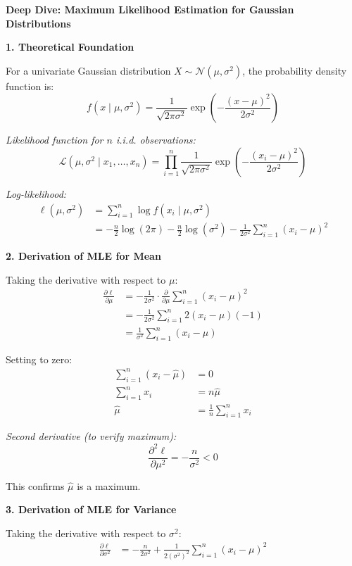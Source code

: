 \documentclass[12pt]{article}
\begin{document}
\begin{explanation}
\textbf{Deep Dive: Maximum Likelihood Estimation for Gaussian Distributions}

\textbf{1. Theoretical Foundation}

For a univariate Gaussian distribution $X \sim \mathcal{N}(\mu, \sigma^2)$, the probability density function is:
\[
f(x \mid \mu, \sigma^2) = \frac{1}{\sqrt{2\pi\sigma^2}} \exp\left(-\frac{(x-\mu)^2}{2\sigma^2}\right)
\]

\textit{Likelihood function for $n$ i.i.d. observations:}
\[
\mathcal{L}(\mu, \sigma^2 \mid x_1, \ldots, x_n) = \prod_{i=1}^{n} \frac{1}{\sqrt{2\pi\sigma^2}} \exp\left(-\frac{(x_i-\mu)^2}{2\sigma^2}\right)
\]

\textit{Log-likelihood:}
\begin{align}
\ell(\mu, \sigma^2) &= \sum_{i=1}^{n} \log f(x_i \mid \mu, \sigma^2) \\
&= -\frac{n}{2}\log(2\pi) - \frac{n}{2}\log(\sigma^2) - \frac{1}{2\sigma^2}\sum_{i=1}^{n}(x_i - \mu)^2
\end{align}

\textbf{2. Derivation of MLE for Mean}

Taking the derivative with respect to $\mu$:
\begin{align}
\frac{\partial \ell}{\partial \mu} &= -\frac{1}{2\sigma^2} \cdot \frac{\partial}{\partial \mu}\sum_{i=1}^{n}(x_i - \mu)^2 \\
&= -\frac{1}{2\sigma^2} \sum_{i=1}^{n} 2(x_i - \mu)(-1) \\
&= \frac{1}{\sigma^2} \sum_{i=1}^{n} (x_i - \mu)
\end{align}

Setting to zero:
\begin{align}
\sum_{i=1}^{n} (x_i - \hat{\mu}) &= 0 \\
\sum_{i=1}^{n} x_i &= n\hat{\mu} \\
\hat{\mu} &= \frac{1}{n}\sum_{i=1}^{n} x_i
\end{align}

\textit{Second derivative (to verify maximum):}
\[
\frac{\partial^2 \ell}{\partial \mu^2} = -\frac{n}{\sigma^2} < 0
\]

This confirms $\hat{\mu}$ is a maximum.

\textbf{3. Derivation of MLE for Variance}

Taking the derivative with respect to $\sigma^2$:
\begin{align}
\frac{\partial \ell}{\partial \sigma^2} &= -\frac{n}{2\sigma^2} + \frac{1}{2(\sigma^2)^2}\sum_{i=1}^{n}(x_i - \mu)^2
\end{align}


\end{explanation}
\end{document}

